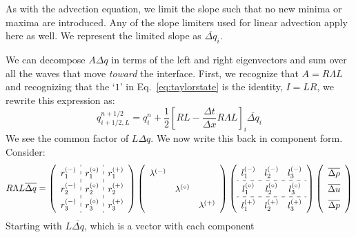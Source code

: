 \documentclass[11pt]{article}
\newcommand{\evm}{{(-)}}
\newcommand{\evz}{{(\circ)}}
\newcommand{\evp}{{(+)}}
\begin{document}
As with the advection equation, we limit the slope such that no new minima
or maxima are introduced.  Any of the slope limiters used for linear advection
apply here as well.  We represent the limited slope as $\overline{\Delta q}_i$.

We can decompose $A \Delta q$ in terms of the left and right
eigenvectors and sum over all the waves that move {\em toward} the
interface.  First, we recognize that $A = R \Lambda L$ and recognizing
that the `$1$'
in Eq.~\ref{eq:taylorstate} is the identity, $I = LR$, we rewrite this
expression as:
\begin{equation}
q_{i+1/2,L}^{n+1/2} = q_i^n + 
     \frac{1}{2} \left [ RL - \frac{\Delta t}{\Delta x} R\Lambda L \right ]_i \overline{\Delta q}_i
\end{equation}
We see the common factor of $L \Delta q$.  We now write this back in
component form.  Consider:
\begin{equation}
\renewcommand{\arraystretch}{1.5}
R\Lambda L \overline{\Delta q} =
   \left ( \begin{array}{c:c:c}
             r_1^\evm & r_1^\evz & r_1^\evp \\
             r_2^\evm & r_2^\evz & r_2^\evp \\
             r_3^\evm & r_3^\evz & r_3^\evp \end{array} \right )
   \left ( \begin{array}{ccc}
             \lambda^\evm &              & \\
                          & \lambda^\evz & \\
                          &              & \lambda^\evp \end{array} \right )
   \left ( \begin{array}{ccc}
             l_1^\evm & l_2^\evm & l_3^\evm \\
             \hdashline 
             l_1^\evz & l_2^\evz & l_3^\evz \\
             \hdashline
             l_1^\evp & l_2^\evp & l_3^\evp \end{array} \right )
   \left ( \begin{array}{c}
            \overline{\Delta \rho} \\
            \overline{\Delta u} \\
            \overline{\Delta p} \end{array} \right )
\renewcommand{\arraystretch}{1.0}
\end{equation}
Starting with $L \overline{\Delta q}$, which is a vector with each component
\end{document}
